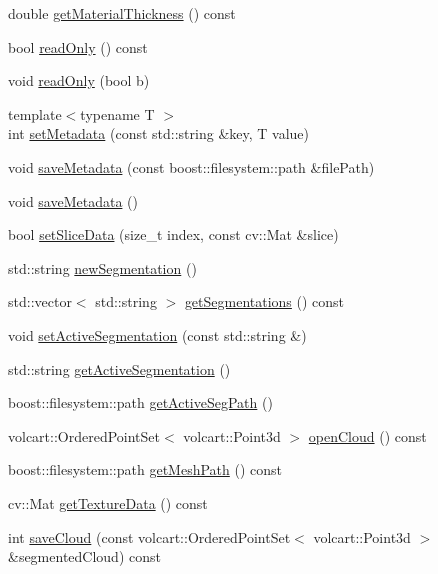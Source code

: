 \begin{DoxyCompactItemize}
double \hyperlink{classVolumePkg_a84a0f3f538667094dc498124f0eb548c}{get\+Material\+Thickness} () const
\item 
bool \hyperlink{classVolumePkg_a1cf5ee88ba2392ab825619ef7890d7ae}{read\+Only} () const
\item 
void \hyperlink{classVolumePkg_a4dba1fc88e4390da1ad9fadf4c73b41b}{read\+Only} (bool b)
\item 
{\footnotesize template$<$typename T $>$ }\\int \hyperlink{classVolumePkg_a560d401f04a486c0277e37b3e2607886}{set\+Metadata} (const std\+::string \&key, T value)
\item 
void \hyperlink{classVolumePkg_abdccc4c348d57a7ea84a65c48ee50c75}{save\+Metadata} (const boost\+::filesystem\+::path \&file\+Path)
\item 
void \hyperlink{classVolumePkg_a49a81e85ddb0fb188efdeb357592b99f}{save\+Metadata} ()
\item 
bool \hyperlink{classVolumePkg_a8d062ac46538de627f67f56ab35d6943}{set\+Slice\+Data} (size\+\_\+t index, const cv\+::\+Mat \&slice)
\item 
std\+::string \hyperlink{classVolumePkg_ae57e71436c7e3c4db73be88b49924637}{new\+Segmentation} ()
\item 
std\+::vector$<$ std\+::string $>$ \hyperlink{classVolumePkg_a833271b79606cea077a5932ae0bd054e}{get\+Segmentations} () const
\item 
void \hyperlink{classVolumePkg_a2e64ca436996febd6ce9aed9edb0a59e}{set\+Active\+Segmentation} (const std\+::string \&)
\item 
std\+::string \hyperlink{classVolumePkg_ab603499204250e15b5532acb51e750d6}{get\+Active\+Segmentation} ()
\item 
boost\+::filesystem\+::path \hyperlink{classVolumePkg_a7af137a5ab84ca0b945faef2adf2a75f}{get\+Active\+Seg\+Path} ()
\item 
volcart\+::\+Ordered\+Point\+Set$<$ volcart\+::\+Point3d $>$ \hyperlink{classVolumePkg_a93ab30fd1648cda039edff14b25f2d8b}{open\+Cloud} () const
\item 
boost\+::filesystem\+::path \hyperlink{classVolumePkg_a898bdeb06e84c1b2bdebc89b327ba6a7}{get\+Mesh\+Path} () const
\item 
cv\+::\+Mat \hyperlink{classVolumePkg_abb42726353738af10e922d0ef41406d6}{get\+Texture\+Data} () const
\item 
int \hyperlink{classVolumePkg_ad8e7c0e7bf2ae1b6771533fe60e91625}{save\+Cloud} (const volcart\+::\+Ordered\+Point\+Set$<$ volcart\+::\+Point3d $>$ \&segmented\+Cloud) const

\end{DoxyCompactItemize}
